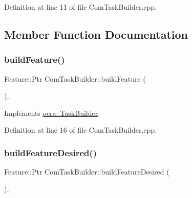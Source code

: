 Definition at line 11 of file Com\+Task\+Builder.\+cpp.



\subsection{Member Function Documentation}
\hypertarget{classocra_1_1ComTaskBuilder_aa4e0d21159da91788a1d2806ddca84da}{}\label{classocra_1_1ComTaskBuilder_aa4e0d21159da91788a1d2806ddca84da} 
\subsubsection{\texorpdfstring{build\+Feature()}{buildFeature()}}
{\footnotesize\ttfamily Feature\+::\+Ptr Com\+Task\+Builder\+::build\+Feature (\begin{DoxyParamCaption}{ }\end{DoxyParamCaption})\hspace{0.3cm}{\ttfamily [protected]}, {\ttfamily [virtual]}}



Implements \hyperlink{classocra_1_1TaskBuilder_a58c0dc416a9607a344a080248ee26ac2}{ocra\+::\+Task\+Builder}.



Definition at line 16 of file Com\+Task\+Builder.\+cpp.

\hypertarget{classocra_1_1ComTaskBuilder_abdd4c74539a37ff4c719c0ac78812bf4}{}\label{classocra_1_1ComTaskBuilder_abdd4c74539a37ff4c719c0ac78812bf4} 
\subsubsection{\texorpdfstring{build\+Feature\+Desired()}{buildFeatureDesired()}}
{\footnotesize\ttfamily Feature\+::\+Ptr Com\+Task\+Builder\+::build\+Feature\+Desired (\begin{DoxyParamCaption}{ }\end{DoxyParamCaption})\hspace{0.3cm}{\ttfamily [protected]}, {\ttfamily [virtual]}}



